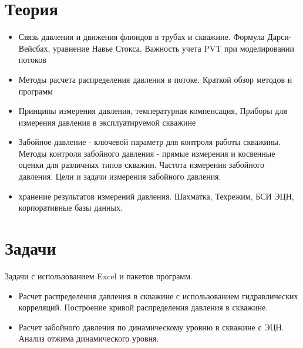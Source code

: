 \section{Теория}
\begin{itemize}
    \item Связь давления и движения флюидов в трубах и скважине. Формула Дарси-Вейсбах, уравнение Навье Стокса. Важность учета PVT при моделировании потоков
    \item Методы расчета распределения давления в потоке. Краткой обзор методов и программ
    \item Принципы измерения давления, температурная компенсация, Приборы для измерения давления в эксплуатируемой скважине
    \item Забойное давление - ключевой параметр для контроля работы скважины. Методы контроля забойного давления - прямые измерения и косвенные оценки для различных типов скважин. Частота измерения забойного давления. Цели и задачи измерения забойного давления.
    \item хранение результатов измерений давления. Шахматка, Техрежим, БСИ ЭЦН, корпоративные базы данных.
\end{itemize}

\section{Задачи}

Задачи с использованием Excel и пакетов программ. 

\begin{itemize}
    \item Расчет распределения давления в скважине с использованием гидравлических корреляций. Построение кривой распределения давления в скважине.
    \item Расчет забойного давления по динамическому уровню в скважине с ЭЦН. Анализ отжима динамического уровня. 
\end{itemize}
